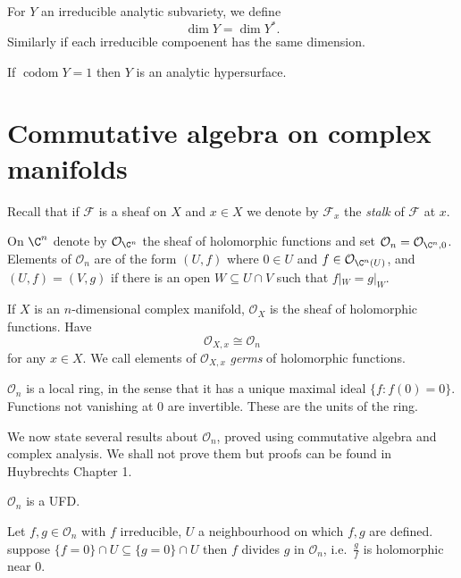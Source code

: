 \documentclass[a4paper]{article}
\begin{document}
\begin{definition}
  For \(Y\) an irreducible analytic subvariety, we define
  \[
    \dim Y = \dim Y^*.
  \]
  Similarly if each irreducible compoenent has the same dimension.

\end{definition}

If \(\operatorname{codom} Y = 1\) then \(Y\) is an analytic hypersurface.

\section{Commutative algebra on complex manifolds}

Recall that if \(\mathcal F\) is a sheaf on \(X\) and \(x \in X\) we denote by \(\mathcal F_x\) the \emph{stalk} of \(\mathcal F\) at \(x\).

On \(\C^n\) denote by \(\mathcal O_{\C^n}\) the sheaf of holomorphic functions and set \(\mathcal O_n = \mathcal O_{\C^n, 0}\). Elements of \(\mathcal O_n\) are of the form \((U, f)\) where \(0 \in U\) and \(f \in \mathcal O_{\C^n(U)}\), and \((U, f) = (V, g)\) if there is an open \(W \subseteq U \cap V\) such that \(f|_W = g|_W\).

If \(X\) is an \(n\)-dimensional complex manifold, \(\mathcal O_X\) is the sheaf of holomorphic functions. Have
\[
  \mathcal O_{X, x} \cong \mathcal O_n
\]
for any \(x \in X\). We call elements of \(\mathcal O_{X, x}\) \emph{germs} of holomorphic functions.

\(\mathcal O_n\) is a local ring, in the sense that it has a unique maximal ideal \(\{f: f(0) = 0\}\). Functions not vanishing at \(0\) are invertible. These are the units of the ring.

We now state several results about \(\mathcal O_n\), proved using commutative algebra and complex analysis. We shall not prove them but proofs can be found in Huybrechts Chapter 1.

\begin{theorem}
  \(\mathcal O_n\) is a UFD.
\end{theorem}

\begin{theorem}
  Let \(f, g \in \mathcal O_n\) with \(f\) irreducible, \(U\) a neighbourhood on which \(f, g\) are defined. suppose \(\{f = 0\} \cap U \subseteq \{g = 0\} \cap U\) then \(f\) divides \(g\) in \(\mathcal O_n\), i.e.\ \(\frac{g}{f}\) is holomorphic near \(0\).
\end{theorem}
\end{document}
